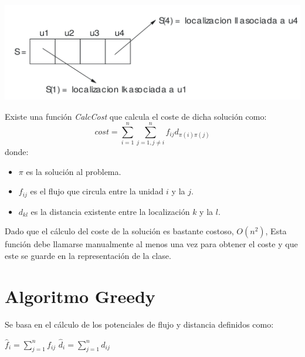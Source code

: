 \documentclass[a4paper, 12pt]{article}
\begin{document}
   \begin{center}
      \includegraphics[scale=0.14]{solRep}
   \end{center}
   
   Existe una función \textit{CalcCost} que calcula el coste de dicha solución como:
      $$cost = \sum_{i=1}^{n}\sum_{j=1, j \neq i}^{n} f_{ij}d_{\pi(i)\pi(j)}$$
   donde:
   \begin{itemize}
      \item $\pi$ es la solución al problema.
      
      \item $f_{ij}$ es el flujo que circula entre la unidad $i$ y la $j$.
      
      \item $d_{kl}$ es la distancia existente entre la localización $k$ y la $l$.
   \end{itemize}\vspace*{0.5cm}
   
   Dado que el cálculo del coste de la solución es bastante costoso, $O(n^{2})$, Esta función debe llamarse manualmente al menos una vez para obtener el coste y que este se guarde en la representación de la clase.
   
   
   \newpage
   \section{Algoritmo Greedy}
   Se basa en el cálculo de los potenciales de flujo y distancia definidos como:
   \begin{center}
      $\hat{f}_i = \sum_{j=1}^{n}f_{ij}$ \hspace*{1cm} $\hat{d}_i = \sum_{j=1}^{n}d_{ij}$
   \end{center}
   
\end{document}
